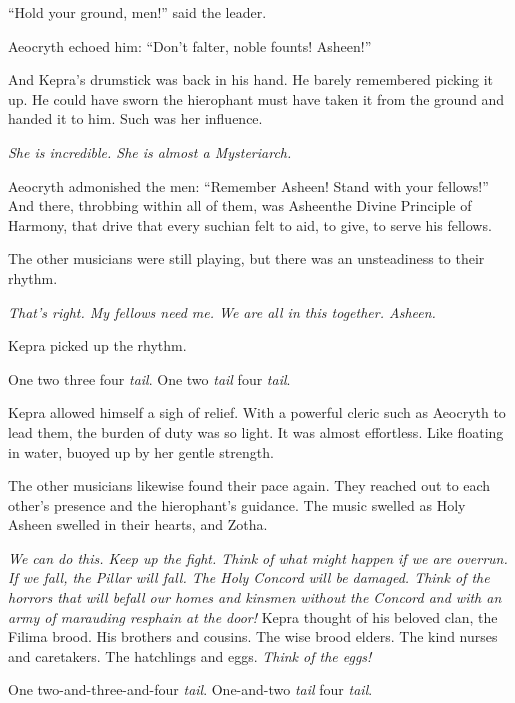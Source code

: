 \documentclass
  [a4paper,
   12pt,
   oneside
  ]%
  {article}
\newcommand{\drum}[1]{\textsf{#1}}
\begin{document}
``Hold your ground, men!'' said the leader.

Aeocryth echoed him: ``Don’t falter, noble founts! Asheen!''

And Kepra's drumstick was back in his hand. He barely remembered picking it up. 
He could have sworn the hierophant must have taken it from the ground and handed it to him. Such was her influence. 

\emph{She is incredible. She is almost a Mysteriarch.}

Aeocryth admonished the men: ``Remember Asheen! Stand with your fellows!''
And there, throbbing within all of them, was Asheen\dash{}the Divine Principle of Harmony, that drive that every suchian felt to aid, to give, to serve his fellows.

The other musicians were still playing, but there was an unsteadiness to their rhythm.

\emph{That's right. My fellows need me. We are all in this together. Asheen.}

Kepra picked up the rhythm.

\drum{One two three four \emph{tail}. One two \emph{tail} four \emph{tail}.}

Kepra allowed himself a sigh of relief.
With a powerful cleric such as Aeocryth to lead them, the burden of duty was so light. 
It was almost effortless. 
Like floating in water, buoyed up by her gentle strength.

The other musicians likewise found their pace again. 
They reached out to each other’s presence and the hierophant’s guidance. 
The music swelled as Holy Asheen swelled in their hearts, and Zotha.

\emph{
    We can do this.
    Keep up the fight. Think of what might happen if we are overrun. If we fall, the Pillar will fall. The Holy Concord will be damaged. 
    Think of the horrors that will befall our homes and kinsmen without the Concord and with an army of marauding resphain at the door!%
} 
Kepra thought of his beloved clan, the Filima brood. His brothers and cousins. The wise brood elders. The kind nurses and caretakers. The hatchlings and eggs. 
\emph{Think of the eggs!}

\drum{One two-and-three-and-four \emph{tail}. One-and-two \emph{tail} four \emph{tail}.}
\end{document}
